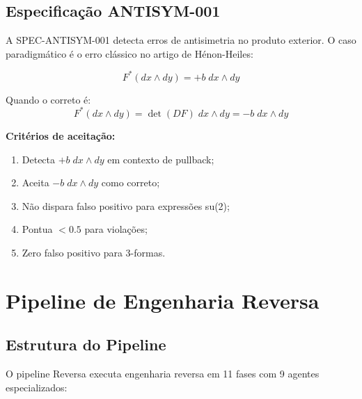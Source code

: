 \documentclass[12pt,a4paper,sumario=tradicional]{abntex2}
\begin{document}
\section{Especificação ANTISYM-001}

A SPEC-ANTISYM-001 detecta erros de antisimetria no produto exterior. O caso paradigmático é o erro clássico no artigo de Hénon-Heiles:

\begin{equation}
F^*(dx \wedge dy) = +b\;dx \wedge dy
\end{equation}

Quando o correto é:
\begin{equation}
F^*(dx \wedge dy) = \det(DF)\;dx \wedge dy = -b\;dx \wedge dy
\end{equation}

\textbf{Critérios de aceitação:}
\begin{enumerate}
    \item Detecta $+b\;dx\wedge dy$ em contexto de pullback;
    \item Aceita $-b\;dx\wedge dy$ como correto;
    \item Não dispara falso positivo para expressões su(2);
    \item Pontua $< 0.5$ para violações;
    \item Zero falso positivo para 3-formas.
\end{enumerate}

\chapter{Pipeline de Engenharia Reversa}

\section{Estrutura do Pipeline}

O pipeline Reversa executa engenharia reversa em 11 fases com 9 agentes especializados:
\end{document}

